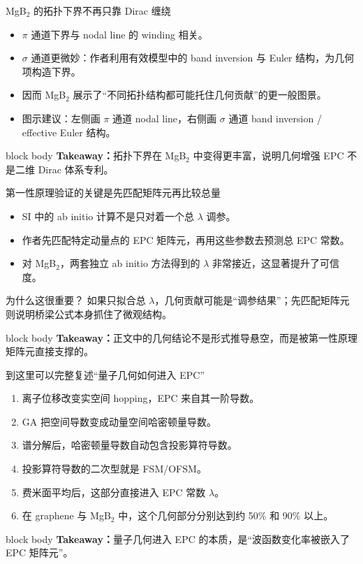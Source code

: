 \documentclass[aspectratio=169,11pt,UTF8]{ctexbeamer}
\newcommand{\takeaway}[1]{%
  \vfill
  \begin{beamercolorbox}[wd=\textwidth,sep=0.7ex,rounded=true]{block body}
    \small\textbf{Takeaway：}#1
  \end{beamercolorbox}
}
\begin{document}
\begin{frame}[fragile]{MgB$_2$ 的拓扑下界不再只靠 Dirac 缠绕}
  \begin{itemize}
    \item $\pi$ 通道下界与 nodal line 的 winding 相关。
    \item $\sigma$ 通道更微妙：作者利用有效模型中的 band inversion 与 Euler 结构，为几何项构造下界。
    \item 因而 MgB$_2$ 展示了“不同拓扑结构都可能托住几何贡献”的更一般图景。
  \item 图示建议：左侧画 $\pi$ 通道 nodal line，右侧画 $\sigma$ 通道 band inversion / effective Euler 结构。
  \end{itemize}
  \takeaway{拓扑下界在 MgB$_2$ 中变得更丰富，说明几何增强 EPC 不是二维 Dirac 体系专利。}
\end{frame}

\begin{frame}{第一性原理验证的关键是先匹配矩阵元再比较总量}
  \begin{itemize}
    \item SI 中的 ab initio 计算不是只对着一个总 $\lambda$ 调参。
    \item 作者先匹配特定动量点的 EPC 矩阵元，再用这些参数去预测总 EPC 常数。
    \item 对 MgB$_2$，两套独立 ab initio 方法得到的 $\lambda$ 非常接近，这显著提升了可信度。
  \end{itemize}
  \begin{block}{为什么这很重要？}
    如果只拟合总 $\lambda$，几何贡献可能是“调参结果”；先匹配矩阵元则说明桥梁公式本身抓住了微观结构。
  \end{block}
  \takeaway{正文中的几何结论不是形式推导悬空，而是被第一性原理矩阵元直接支撑的。}
\end{frame}

\begin{frame}{到这里可以完整复述“量子几何如何进入 EPC”}
  \begin{enumerate}
    \item 离子位移改变实空间 hopping，EPC 来自其一阶导数。
    \item GA 把空间导数变成动量空间哈密顿量导数。
    \item 谱分解后，哈密顿量导数自动包含投影算符导数。
    \item 投影算符导数的二次型就是 FSM/OFSM。
    \item 费米面平均后，这部分直接进入 EPC 常数 $\lambda$。
    \item 在 graphene 与 MgB$_2$ 中，这个几何部分分别达到约 50\% 和 90\% 以上。
  \end{enumerate}
  \takeaway{量子几何进入 EPC 的本质，是“波函数变化率被嵌入了 EPC 矩阵元”。}
\end{frame}
\end{document}
